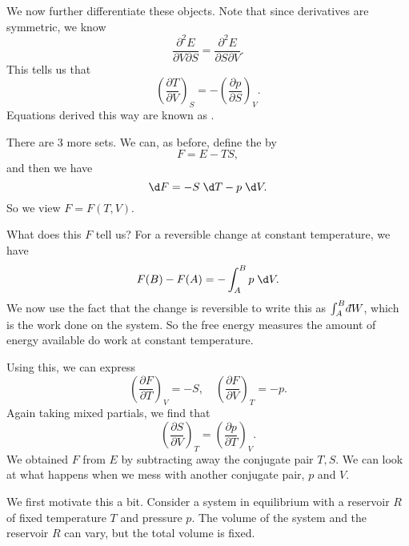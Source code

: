 \documentclass[a4paper]{article}
\def\di{{\mathchar'26\mkern-12mu d}}
\begin{document}
We now further differentiate these objects. Note that since derivatives are symmetric, we know
\[
  \frac{\partial^2 E}{\partial V\partial S} = \frac{\partial^2 E}{\partial S\partial V}.
\]
This tells us that
\[
  \left(\frac{\partial T}{\partial V}\right)_S = - \left(\frac{\partial p}{\partial S}\right)_V.
\]
Equations derived this way are known as .

There are $3$ more sets. We can, as before, define the  by
\[
  F = E - TS,
\]
and then we have
\[
  \d F = - S \;\d T - p \;\d V.
\]
So we view $F = F(T, V)$.

What does this $F$ tell us? For a reversible change at constant temperature, we have
\[
  F(B) - F(A) = - \int_A^B p \;\d V.
\]
We now use the fact that the change is reversible to write this as $\int_A^B \di W$, which is the work done on the system. So the free energy measures the amount of energy available do work at constant temperature.

Using this, we can express
\[
  \left(\frac{\partial F}{\partial T}\right)_V = - S,\quad \left(\frac{\partial F}{\partial V}\right)_T =- p.
\]
Again taking mixed partials, we find that
\[
  \left(\frac{\partial S}{\partial V}\right)_T = \left(\frac{\partial p}{\partial T}\right)_V.
\]
We obtained $F$ from $E$ by subtracting away the conjugate pair $T, S$. We can look at what happens when we mess with another conjugate pair, $p$ and $V$.

We first motivate this a bit. Consider a system in equilibrium with a reservoir $R$ of fixed temperature $T$ and pressure $p$. The volume of the system and the reservoir $R$ can vary, but the total volume is fixed.
\end{document}
